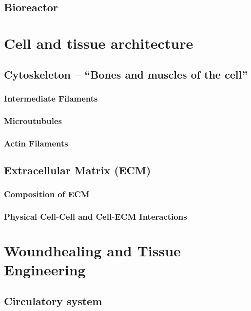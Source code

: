 \documentclass[12pt]{cheatsheet}
\begin{document}
\subsection*{Bioreactor}


\section*{Cell and tissue architecture}
\subsection*{Cytoskeleton – “Bones and muscles of the cell”}

\subsubsection*{Intermediate Filaments}

\subsubsection*{Microutubules}

\subsubsection*{Actin Filaments}

\subsection*{Extracellular Matrix (ECM)}

\subsubsection*{Composition of ECM}

\subsubsection*{Physical Cell-Cell and Cell-ECM Interactions}


\section*{Woundhealing and Tissue Engineering}
\subsection*{Circulatory system}

\end{document}
